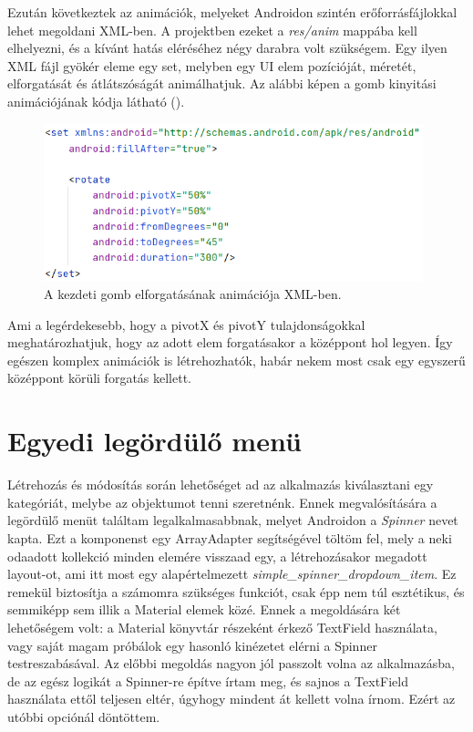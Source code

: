 Ezután következtek az animációk, melyeket Androidon szintén erőforrásfájlokkal lehet megoldani XML-ben. A projektben ezeket a \emph{res/anim} mappába kell elhelyezni, és a kívánt hatás eléréséhez négy darabra volt szükségem. Egy ilyen XML fájl gyökér eleme egy set, melyben egy UI elem pozícióját, méretét, elforgatását és átlátszóságát animálhatjuk. Az alábbi képen a gomb kinyitási animációjának kódja látható ().

\begin{figure}[!ht]
	\centering
	\includegraphics[width=110mm, keepaspectratio]{figures/animation_example.png}
	\caption{A kezdeti gomb elforgatásának animációja XML-ben.}
	\label{fig:ButtonAnimation}
\end{figure}

Ami a legérdekesebb, hogy a pivotX és pivotY tulajdonságokkal meghatározhatjuk, hogy az adott elem forgatásakor a középpont hol legyen. Így egészen komplex animációk is létrehozhatók, habár nekem most csak egy egyszerű középpont körüli forgatás kellett.

\section{Egyedi legördülő menü}
Létrehozás és módosítás során lehetőséget ad az alkalmazás kiválasztani egy kategóriát, melybe az objektumot tenni szeretnénk. Ennek megvalósítására a legördülő menüt találtam legalkalmasabbnak, melyet Androidon a \emph{Spinner} nevet kapta. Ezt a komponenst egy ArrayAdapter segítségével töltöm fel, mely a neki odaadott kollekció minden elemére visszaad egy, a létrehozásakor megadott layout-ot, ami itt most egy alapértelmezett \emph{simple\_spinner\_dropdown\_item}. Ez remekül biztosítja a számomra szükséges funkciót, csak épp nem túl esztétikus, és semmiképp sem illik a Material elemek közé. Ennek a megoldására két lehetőségem volt: a Material könyvtár részeként érkező TextField használata, vagy saját magam próbálok egy hasonló kinézetet elérni a Spinner testreszabásával. Az előbbi megoldás nagyon jól passzolt volna az alkalmazásba, de az egész logikát a Spinner-re építve írtam meg, és sajnos a TextField használata ettől teljesen eltér, úgyhogy mindent át kellett volna írnom. Ezért az utóbbi opciónál döntöttem.

